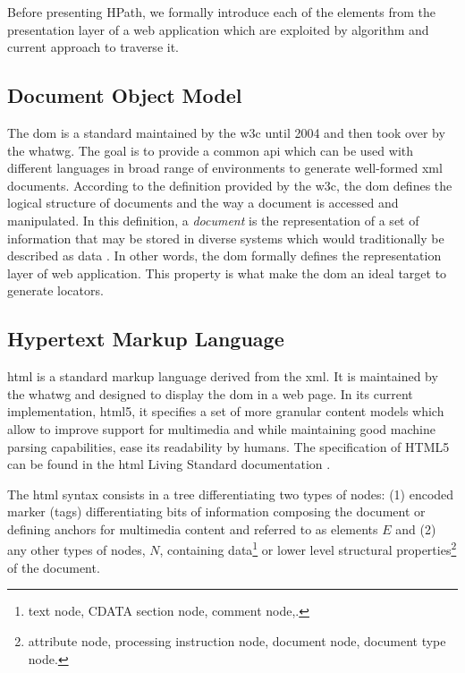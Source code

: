 Before presenting HPath, we formally introduce each of the elements from the presentation layer of a web application which are exploited by algorithm and current approach to traverse it.

\subsection{Document Object Model}
\label{sec:hpath-introduction-DOM}

The \gls{dom} is a standard maintained by the \gls{w3c} until 2004 and then took over by the \gls{whatwg}. The goal is to provide a common \gls{api} which can be used with different languages in broad range of environments to generate well-formed \gls{xml} documents. According to the definition provided by the \gls{w3c}, the \gls{dom} defines the logical structure of documents and the way a document is accessed and manipulated. In this definition, a \emph{document} is the representation of a set of information that may be stored in diverse systems which would traditionally be described as data \cite{W3C2004}. In other words, the \gls{dom} formally defines the representation layer of web application. This property is what make the \gls{dom} an ideal target to generate locators.

\subsection{Hypertext Markup Language}
\label{sec:hpath-introduction-HTML}

\gls{html} is a standard markup language derived from the \gls{xml}. It is maintained by the \gls{whatwg} and designed to display the \gls{dom} in a web page. In its current implementation, \gls{html}5, it specifies a set of more granular content models which allow to improve support for multimedia and while maintaining good machine parsing capabilities, ease its readability by humans. The specification of HTML5 can be found in the \gls{html} Living Standard documentation \cite{WHATWG2021}. 

The \gls{html} syntax consists in a tree differentiating two types of nodes: (1) encoded marker (tags) differentiating bits of information composing the document or defining anchors for multimedia content and referred to as elements $E$ and (2) any other types of nodes, $N$, containing data\footnote{text node, CDATA section node, comment node,.} or lower level structural properties\footnote{attribute node, processing instruction node, document node, document type node.} of the document.

